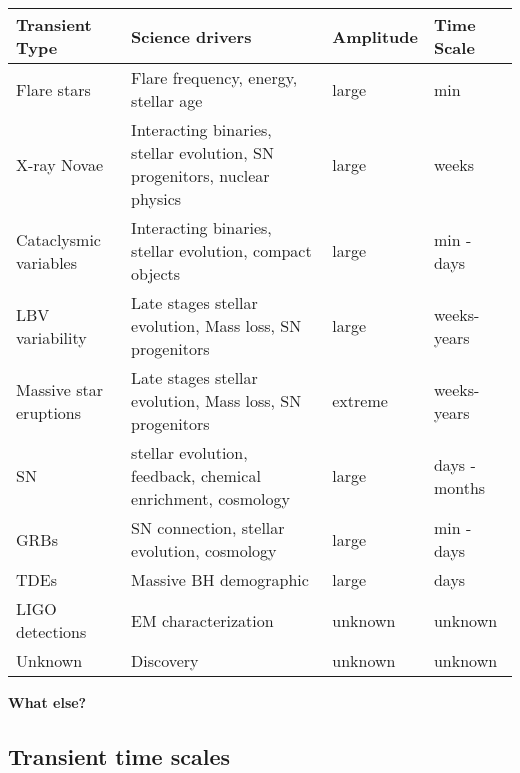 \begin{center}
\begin{tabular}{| p{3cm} | p{8cm} | l | l |}
    \hline

    Transient Type & Science drivers & Amplitude & Time Scale\\
\hline

Flare stars & Flare frequency, energy, stellar age & large & min \\

X-ray Novae & Interacting binaries, stellar evolution, SN progenitors, nuclear physics & large & weeks \\

Cataclysmic variables & Interacting binaries, stellar evolution, compact objects & large & min - days\\

LBV variability & Late stages stellar evolution, Mass loss, SN progenitors & large & weeks-years\\

Massive star eruptions & Late stages stellar evolution, Mass loss, SN progenitors & extreme & weeks-years\\

SN & stellar evolution, feedback, chemical enrichment, cosmology & large & days - months \\

GRBs & SN connection, stellar evolution, cosmology & large & min - days\\

TDEs & Massive BH demographic & large & days\\

LIGO detections & EM characterization & unknown & unknown\\

Unknown & Discovery & unknown & unknown\\

 \hline \end{tabular}
 \end{center}


{\bf What else?}




%




\subsection{Transient time scales}

